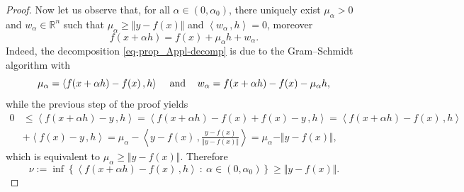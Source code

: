 \documentclass[12pt]{amsart}
\theoremstyle{remark}
\newtheorem{claim}{Claim}
\newtheorem{prclm}{Proof of Claim}[section]
\theoremstyle{definition}
\newcommand{\Rn}{\mathbb{R}^n}
\newcommand{\nma}{\Vert}
\newcommand{\bsz}[2]{\left \langle #1 \,, #2 \right \rangle}
\begin{document}
\begin{proof}
Now let us observe that, 
for all $ \alpha \in (0,\alpha_0) $, 
there uniquely exist 
$ \mu_{\alpha} > 0 $ and $ w_{\alpha} \in \Rn $ 
such that $ \mu_{\alpha} \geq \nma y - f(x) \nma $ 
and $ \bsz{w_{\alpha}}{h} = 0 $, moreover 
\begin{equation}\label{eq-prop_Appl-decomp}
f(x + \alpha h) = f(x) + \mu_{\alpha} h + w_{\alpha}. 
\end{equation}
%
Indeed, 
the decomposition \eqref{eq-prop_Appl-decomp} is 
due to the Gram--Schmidt algorithm with 
\[
\mu_{\alpha} = \bsz{f(x + \alpha h)-f(x)}{h} 
\hspace{3mm} \mbox{ and } \hspace{3mm} 
w_{\alpha} = f(x+ \alpha h) - f(x) - \mu_{\alpha} h, 
\]
while the previous step of the proof yields 
\begin{align*}
0 & \leq \bsz{f(x + \alpha h) - y}{h} = 
\bsz{f(x + \alpha h) - f(x) + f(x) -y}{h} = 
\bsz{f(x+\alpha h)-f(x)}{h} \\ 
& + \bsz{f(x) - y}{h} 
= \mu_{\alpha} - \bsz{y-f(x)}{\frac{y-f(x)}{\nma y-f(x) \nma}} 
= \mu_{\alpha} - \nma y - f(x) \nma, 
\end{align*}
which is equivalent to 
$ \mu_{\alpha} \geq \nma y - f(x) \nma $. 
Therefore 
\begin{equation}\label{eq-prop_Appl_nu}
\nu := \inf 
\left \lbrace 
\bsz{f(x+\alpha h)-f(x)}{h} \ : \ 
\alpha \in \left( 0,\alpha_0 \right) 
\right \rbrace
\geq 
\nma y - f(x) \nma . 
\end{equation}


\end{proof}
\end{document}
